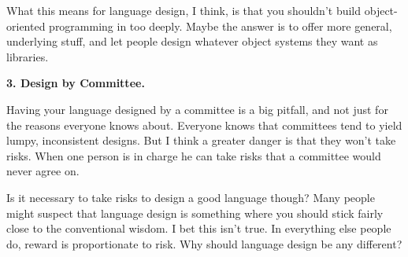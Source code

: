 What
                    this means for language design, I think, is that you
                    shouldn't build object-oriented programming in too deeply.
                    Maybe the answer is to offer more general, underlying stuff,
                    and let people design whatever object systems they want as
                    libraries.

\textbf{3. Design by Committee.}

Having your language designed by a committee is
                    a big pitfall, and not just for the reasons everyone knows
                    about. Everyone knows that committees tend to yield lumpy,
                    inconsistent designs. But I think a greater danger is that
                    they won't take risks. When one person is in charge he can
                    take risks that a committee would never agree on.

Is
                    it necessary to take risks to design a good language though?
                    Many people might suspect that language design is something
                    where you should stick fairly close to the conventional
                    wisdom. I bet this isn't true. In everything else people do,
                    reward is proportionate to risk. Why should language design
                    be any different?



              
            
          
